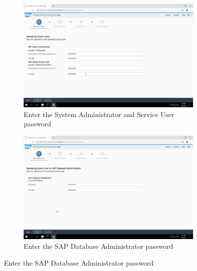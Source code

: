 \begin{figure}[!htb]\ContinuedFloat
    \begin{subfigure}{0.5\textwidth}
        \captionsetup{width=0.8\linewidth}
        \includegraphics[width=0.9\linewidth]{img/Methodologie/SAP28.png}
        \centering
        \caption{Enter the System Administrator and Service User password}
    \end{subfigure}
    \begin{subfigure}{0.5\textwidth}
        \captionsetup{width=0.8\linewidth}
        \includegraphics[width=0.9\linewidth]{img/Methodologie/SAP27.png} 
        \centering
        \caption{Enter the SAP Database Administrator password}
    \end{subfigure}
\end{figure}
